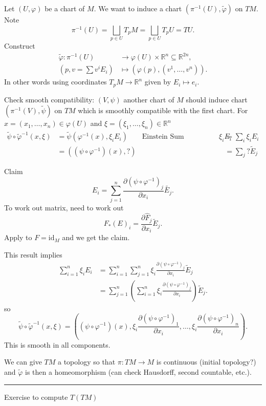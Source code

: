 \documentclass[12pt]{article}
\newcommand{\sepline}{\rule{\textwidth}{0.4pt}}
\theoremstyle{definition}
\newcommand{\R}{\mathbb{R}}
\renewcommand{\phi}{\varphi}
\newcommand{\<}{\left\langle}
\renewcommand{\>}{\right\rangle}
\newcommand{\seq}{\subseteq}
\newcommand{\To}{\longrightarrow}
\newcommand{\Mapsto}{\longmapsto}
\newcommand{\id}{\mathrm{id}}
\newcommand{\pdv}[2]{\frac{\partial #1}{\partial #2}}
\renewcommand{\hat}{\widehat}
\renewcommand{\tilde}{\widetilde}
\newcommand{\tsum}{{\textstyle\sum}}
\begin{document}
Let $(U, \phi)$ be a chart of $M$.
We want to induce a chart $(\pi^{-1}(U), \tilde{\phi})$ on $TM$.
Note
\[
    \pi^{-1}(U)
        = \bigsqcup_{p \in U} T_pM
        = \bigsqcup_{p \in U} T_pU
        = TU.
\]
Construct
\begin{align*}
    \tilde{\phi} : \pi^{-1}(U) &\To \phi(U) \times \R^n \seq \R^{2n}, \\
        (p, v = \tsum v^iE_i) &\Mapsto (\phi(p), (v^1, \dots, v^n)).
\end{align*}
In other words using coordinates $T_pM \to \R^n$ given by $E_i \mapsto e_i$.

Check smooth compatibility: $(V, \psi)$ another chart of $M$ should induce chart $(\pi^{-1}(V), \tilde{\psi})$ on $TM$ which is smoothly compatible with the first chart.
For $x = (x_1, \dots, x_n) \in \phi(U)$ and $\xi = (\xi_1, \dots, \xi_n) \in \R^n$
\begin{align*}
    \tilde{\psi} \circ \tilde{\phi}^{-1}(x, \xi)
        &= \tilde{\psi}(\phi^{-1}(x), \xi_iE_i)
            & \text{Einstein Sum Convention } \xi_iE_i &= \tsum_i \xi_i E_i \\
        &= ((\psi \circ \phi^{-1})(x), ?)
            & &= \tsum_j ?\tilde{E}_j
\end{align*}

Claim
\[
    E_i = \sum_{j=1}^{n} \pdv{(\psi \circ \phi^{-1})_j}{x_i} \tilde{E_j}.
\]
To work out matrix, need to work out
\[
    F_*(E)_i = \pdv{\hat{F}_j}{x_i}\tilde{E}_j.
\]
Apply to $F = \id_M$ and we get the claim.

This result implies
\begin{align*}
    \sum_{i=1}^{n} \xi_i E_i
        &= \sum_{i=1}^{n} \sum_{j=1}^{n} \xi_i \pdv{(\psi \circ \phi^{-1})_j}{x_i} \tilde{E}_j \\
        &= \sum_{j=1}^{n} \left(\sum_{i=1}^{n} \xi_i \pdv{(\psi \circ \phi^{-1})_j}{x_i} \right) \tilde{E}_j.
\end{align*}
so
\[\textstyle
    \tilde{\psi} \circ \tilde{\phi}^{-1}(x, \xi)
        = \left((\psi \circ \phi^{-1})(x), \xi_i\pdv{(\psi \circ \phi^{-1})_1}{x_i}, \dots, \xi_i\pdv{(\psi \circ \phi^{-1})_n}{x_i}\right).
\]
This is smooth in all components.

We can give $TM$ a topology so that $\pi : TM \to M$ is continuous (initial topology?) and $\tilde{\phi}$ is then a homeomorphism (can check Hausdorff, second countable, etc.).

\sepline

Exercise to compute $T(TM)$
\end{document}
